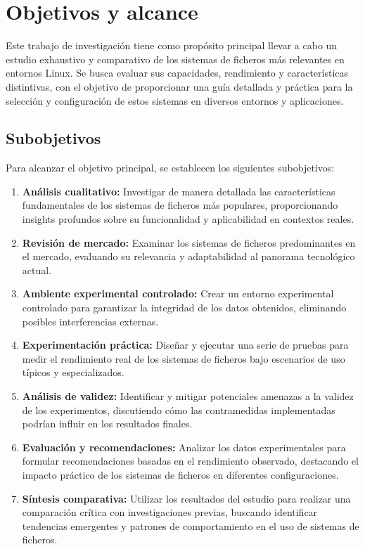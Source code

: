 \section{Objetivos y alcance}

Este trabajo de investigación tiene como propósito principal llevar a cabo un estudio exhaustivo y comparativo de los sistemas de ficheros más relevantes en entornos Linux. Se busca evaluar sus capacidades, rendimiento y características distintivas, con el objetivo de proporcionar una guía detallada y práctica para la selección y configuración de estos sistemas en diversos entornos y aplicaciones.

\subsection{Subobjetivos}

Para alcanzar el objetivo principal, se establecen los siguientes subobjetivos:

\begin{enumerate}
    \item \textbf{Análisis cualitativo:} Investigar de manera detallada las características fundamentales de los sistemas de ficheros más populares, proporcionando insights profundos sobre su funcionalidad y aplicabilidad en contextos reales.
    
    \item \textbf{Revisión de mercado:} Examinar los sistemas de ficheros predominantes en el mercado, evaluando su relevancia y adaptabilidad al panorama tecnológico actual.
    
    \item \textbf{Ambiente experimental controlado:} Crear un entorno experimental controlado para garantizar la integridad de los datos obtenidos, eliminando posibles interferencias externas.
    
    \item \textbf{Experimentación práctica:} Diseñar y ejecutar una serie de pruebas para medir el rendimiento real de los sistemas de ficheros bajo escenarios de uso típicos y especializados.
    
    \item \textbf{Análisis de validez:} Identificar y mitigar potenciales amenazas a la validez de los experimentos, discutiendo cómo las contramedidas implementadas podrían influir en los resultados finales.
    
    \item \textbf{Evaluación y recomendaciones:} Analizar los datos experimentales para formular recomendaciones basadas en el rendimiento observado, destacando el impacto práctico de los sistemas de ficheros en diferentes configuraciones.
    
    \item \textbf{Síntesis comparativa:} Utilizar los resultados del estudio para realizar una comparación crítica con investigaciones previas, buscando identificar tendencias emergentes y patrones de comportamiento en el uso de sistemas de ficheros.
\end{enumerate}

